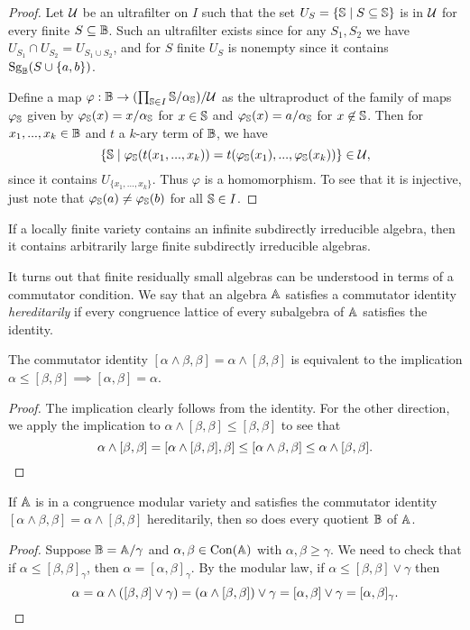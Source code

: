 \begin{appendices}
\begin{proof}
Let $\mathcal{U}$ be an ultrafilter on $I$ such that the set $U_S = \{\mathbb{S} \mid S \subseteq \mathbb{S}\}$ is in $\mathcal{U}$ for every finite $S \subseteq \mathbb{B}$. Such an ultrafilter exists since for any $S_1, S_2$ we have $U_{S_1} \cap U_{S_2} = U_{S_1\cup S_2}$, and for $S$ finite $U_S$ is nonempty since it contains $\operatorname{Sg}_{\mathbb{B}}(S \cup \{a,b\})$.

Define a map $\varphi : \mathbb{B} \rightarrow (\prod_{\mathbb{S} \in I} \mathbb{S}/\alpha_{\mathbb{S}})/\mathcal{U}$ as the ultraproduct of the family of maps $\varphi_{\mathbb{S}}$ given by $\varphi_{\mathbb{S}}(x) = x/\alpha_{\mathbb{S}}$ for $x \in \mathbb{S}$ and $\varphi_{\mathbb{S}}(x) = a/\alpha_{\mathbb{S}}$ for $x \not\in \mathbb{S}$. Then for $x_1, ..., x_k \in \mathbb{B}$ and $t$ a $k$-ary term of $\mathbb{B}$, we have
\[
\{\mathbb{S} \mid \varphi_{\mathbb{S}}(t(x_1, ..., x_k)) = t(\varphi_{\mathbb{S}}(x_1), ..., \varphi_{\mathbb{S}}(x_k))\} \in \mathcal{U},
\]
since it contains $U_{\{x_1, ..., x_k\}}$. Thus $\varphi$ is a homomorphism. To see that it is injective, just note that $\varphi_{\mathbb{S}}(a) \ne \varphi_{\mathbb{S}}(b)$ for all $\mathbb{S} \in I$.
\end{proof}

\begin{cor}\label{residually-infinite} If a locally finite variety contains an infinite subdirectly irreducible algebra, then it contains arbitrarily large finite subdirectly irreducible algebras.
\end{cor}

It turns out that finite residually small algebras can be understood in terms of a commutator condition. We say that an algebra $\mathbb{A}$ satisfies a commutator identity \emph{hereditarily} if every congruence lattice of every subalgebra of $\mathbb{A}$ satisfies the identity.

\begin{prop} The commutator identity $[\alpha \wedge \beta, \beta] = \alpha \wedge [\beta,\beta]$ is equivalent to the implication $\alpha \le [\beta,\beta] \implies [\alpha,\beta] = \alpha$.
\end{prop}
\begin{proof} The implication clearly follows from the identity. For the other direction, we apply the implication to $\alpha \wedge [\beta,\beta] \le [\beta,\beta]$ to see that
\[
\alpha \wedge [\beta,\beta] = [\alpha \wedge [\beta,\beta], \beta] \le [\alpha\wedge \beta,\beta] \le \alpha \wedge [\beta,\beta].\qedhere
\]
\end{proof}

\begin{prop} If $\mathbb{A}$ is in a congruence modular variety and satisfies the commutator identity $[\alpha \wedge \beta,\beta] = \alpha \wedge [\beta,\beta]$ hereditarily, then so does every quotient $\mathbb{B}$ of $\mathbb{A}$.
\end{prop}
\begin{proof} Suppose $\mathbb{B} = \mathbb{A}/\gamma$ and $\alpha,\beta \in \operatorname{Con}(\mathbb{A})$ with $\alpha,\beta \ge \gamma$. We need to check that if $\alpha \le [\beta,\beta]_\gamma$, then $\alpha = [\alpha,\beta]_\gamma$. By the modular law, if $\alpha \le [\beta,\beta]\vee \gamma$ then
\[
\alpha = \alpha \wedge ([\beta,\beta]\vee \gamma) = (\alpha \wedge [\beta,\beta]) \vee \gamma = [\alpha,\beta] \vee \gamma = [\alpha,\beta]_\gamma.\qedhere
\]
\end{proof}


\end{appendices}
